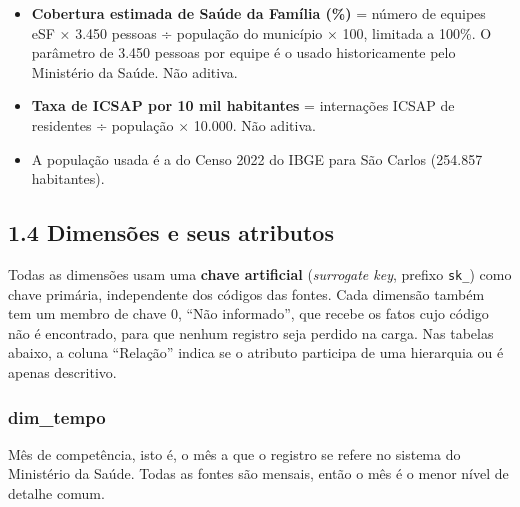 \documentclass[12pt,a4paper]{article}
\begin{document}
\begin{itemize}\item \textbf{Cobertura estimada de Saúde da Família (\%)} = número de equipes eSF × 3.450 pessoas ÷ população do município × 100, limitada a 100\%. O parâmetro de 3.450 pessoas por equipe é o usado historicamente pelo Ministério da Saúde. Não aditiva.
\item \textbf{Taxa de ICSAP por 10 mil habitantes} = internações ICSAP de residentes ÷ população × 10.000. Não aditiva.
\item A população usada é a do Censo 2022 do IBGE para São Carlos (254.857 habitantes).\end{itemize}

\FloatBarrier\subsection*{1.4 Dimensões e seus atributos}

Todas as dimensões usam uma \textbf{chave artificial} (\textit{surrogate key}, prefixo \texttt{sk\_\allowbreak{}}) como chave primária, independente dos códigos das fontes. Cada dimensão também tem um membro de chave 0, “Não informado”, que recebe os fatos cujo código não é encontrado, para que nenhum registro seja perdido na carga. Nas tabelas abaixo, a coluna “Relação” indica se o atributo participa de uma hierarquia ou é apenas descritivo.


\subsubsection*{dim\_\allowbreak{}tempo}

Mês de competência, isto é, o mês a que o registro se refere no sistema do Ministério da Saúde. Todas as fontes são mensais, então o mês é o menor nível de detalhe comum.
\end{document}
